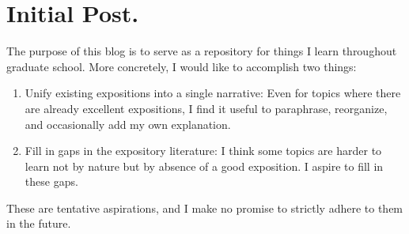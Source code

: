 \documentclass[12pt]{article}
\begin{document}
\section*{Initial Post.}

The purpose of this blog is to serve as a repository for things 
I learn throughout graduate school. More concretely, I would like to accomplish two things: 


\begin{enumerate}
    \item Unify existing expositions into a single narrative: 
    Even for topics where there are already excellent expositions,
    I find it useful to paraphrase, reorganize, and occasionally add my own explanation.
    \item Fill in gaps in the expository literature: 
    I think some topics are harder to learn not by nature 
    but by absence of a good exposition. I aspire to fill in these gaps. 
\end{enumerate}

These are tentative aspirations, and I make no promise to strictly adhere to them in the future. 
\end{document}
